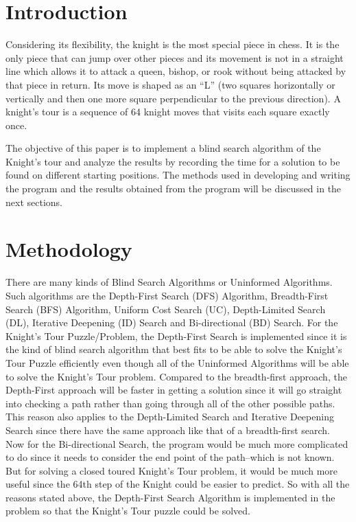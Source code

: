 \section{Introduction}
	Considering its flexibility, the knight is the most special piece in chess.  It is the only piece that can jump over other pieces and its movement is not in a straight line which allows it to attack a queen, bishop, or rook without being attacked by that piece in return.  Its move is shaped as an “L” (two squares horizontally or vertically and then one more square perpendicular to the previous direction).\cite{back1} A knight's tour is a sequence of 64 knight moves that visits each square exactly once.\cite{back2} 

	 The objective of this paper is to implement a blind search algorithm of the Knight's tour and analyze the results by recording the time for a solution to be found on different starting positions. The methods used in developing and writing the program and the results obtained from the program will be discussed in the next sections.

\section{Methodology}
	There are many kinds of Blind Search Algorithms or Uninformed Algorithms. Such algorithms are the Depth-First Search (DFS) Algorithm, Breadth-First Search (BFS) Algorithm, Uniform Cost Search (UC), Depth-Limited Search (DL), Iterative Deepening (ID) Search and Bi-directional (BD) Search. For the Knight's Tour Puzzle/Problem, the Depth-First Search is implemented since it is the kind of blind search algorithm that best fits to be able to solve the Knight's Tour Puzzle efficiently even though all of the Uninformed Algorithms will be able to solve the Knight's Tour problem. Compared to the breadth-first approach, the Depth-First approach will be faster in getting a solution since it will go straight into checking a path rather than going through all of the other possible paths. This reason also applies to the Depth-Limited Search and Iterative Deepening Search since there have the same approach like that of a breadth-first search. Now for the Bi-directional Search, the program would be much more complicated to do since it needs to consider the end point of the path--which is not known. But for solving a closed toured Knight's Tour problem, it would be much more useful since the 64th step of the Knight could be easier to predict. So with all the reasons stated above, the Depth-First Search Algorithm is implemented in the problem so that the Knight's Tour puzzle could be solved.\\


